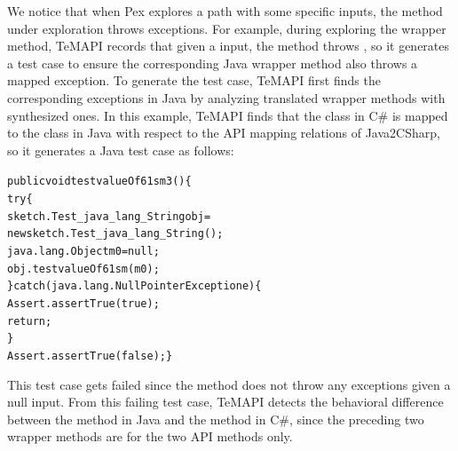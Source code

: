 We notice that when Pex explores a path with some specific inputs, the method under exploration throws exceptions.
For example, during exploring the  wrapper method, TeMAPI records that given a  input, the method throws , so it generates a test case to ensure the corresponding Java wrapper method also throws a mapped exception. To generate the test case, TeMAPI first finds the corresponding exceptions in Java by analyzing translated wrapper methods with synthesized ones. In this example, TeMAPI finds that the  class in C\# is mapped to the  class in Java with respect to the API mapping relations of Java2CSharp, so it generates a Java test case as follows:

\begin{CodeOut}\vspace*{-1ex}
\begin{alltt}
 public void testvalueOf61sm3()\{
   try\{
     sketch.Test_java_lang_String obj =
           new sketch.Test_java_lang_String();
     java.lang.Object m0 = null;
     obj.testvalueOf61sm(m0);
   \}catch(java.lang.NullPointerException e)\{
     Assert.assertTrue(true);
     return;
   \}
   Assert.assertTrue(false); \}
\end{alltt}
\end{CodeOut}\vspace*{-1ex}

This test case gets failed since the  method does not throw any exceptions given a null input.
From this failing test case, TeMAPI detects the behavioral difference between the  method in Java and the  method in C\#, since the preceding two wrapper methods are for the two API methods only.

